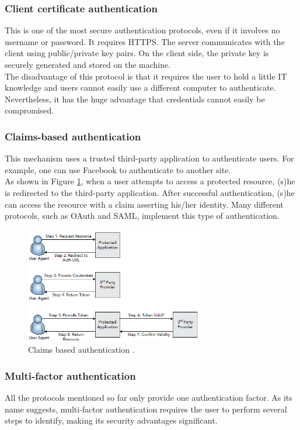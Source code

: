 \documentclass[a4paper, oneside, 11pt]{book}
\begin{document}
\subsubsection{Client certificate authentication}
This is one of the most secure authentication protocols, even if it involves no username or password. It requires HTTPS. The server communicates with the client using public/private key pairs. On the client side, the private key is securely generated and stored on the machine.\\

The disadvantage of this protocol is that it requires the user to hold a little IT knowledge and users cannot easily use a different computer to authenticate. Nevertheless, it has the huge advantage that credentials cannot easily be compromised. 

\subsubsection{Claims-based authentication}
This mechanism uses a trusted third-party application to authenticate users. For example, one can use Facebook to authenticate to another site.\\

As shown in Figure \ref{fig:claimed}, when a user attempts to access a protected resource, (s)he is redirected to the third-party application. After successful authentication, (s)he can access the resource with a claim asserting his/her identity. Many different protocols, such as OAuth and SAML, implement this type of authentication.

\begin{figure}[htbp]
	\centerline{\includegraphics[width=0.7\textwidth]{claimed.png}}
	\caption{Claims based authentication \cite{professional:book}.}
	\label{fig:claimed}
\end{figure}

\subsubsection{Multi-factor authentication}
All the protocols mentioned so far only provide one authentication factor. As its name suggests, multi-factor authentication requires the user to perform several steps to identify, making its security advantages significant.\\
\end{document}
